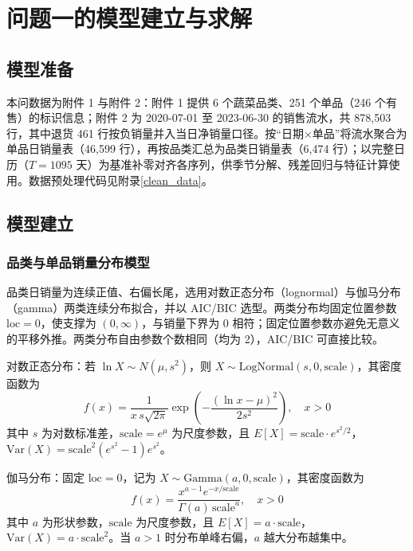 \section{问题一的模型建立与求解}

\subsection{模型准备}

本问数据为附件 1 与附件 2：附件 1 提供 6 个蔬菜品类、251 个单品（246 个有售）的标识信息；附件 2 为 2020-07-01 至 2023-06-30 的销售流水，共 878,503 行，其中退货 461 行按负销量并入当日净销量口径。按“日期$\times$单品”将流水聚合为单品日销量表（46,599 行），再按品类汇总为品类日销量表（6,474 行）；以完整日历（$T=1095$ 天）为基准补零对齐各序列，供季节分解、残差回归与特征计算使用。数据预处理代码见附录\ref{clean_data}。

\subsection{模型建立}

\subsubsection{品类与单品销量分布模型}

品类日销量为连续正值、右偏长尾，选用对数正态分布（lognormal）与伽马分布（gamma）两类连续分布拟合，并以 AIC\cite{akaike1974}/BIC\cite{schwarz1978} 选型。两类分布均固定位置参数 $\mathrm{loc}=0$，使支撑为 $(0,\infty)$，与销量下界为 0 相符；固定位置参数亦避免无意义的平移外推。两类分布自由参数个数相同（均为 2），AIC/BIC 可直接比较。

对数正态分布：若 $\ln X \sim N(\mu, s^2)$，则 $X\sim\mathrm{LogNormal}(s,0,\mathrm{scale})$，其密度函数为
\begin{equation}\label{eq:lognorm}
  f(x)=\frac{1}{x\,s\sqrt{2\pi}}\exp\left(-\frac{(\ln x-\mu)^2}{2s^2}\right),\quad x>0
\end{equation}
其中 $s$ 为对数标准差，$\mathrm{scale}=e^\mu$ 为尺度参数，且 $E[X]=\mathrm{scale}\cdot e^{s^2/2}$，$\mathrm{Var}(X)=\mathrm{scale}^2(e^{s^2}-1)e^{s^2}$。

伽马分布：固定 $\mathrm{loc}=0$，记为 $X\sim\mathrm{Gamma}(a,0,\mathrm{scale})$，其密度函数为
\begin{equation}\label{eq:gamma}
  f(x)=\frac{x^{a-1}e^{-x/\mathrm{scale}}}{\Gamma(a)\,\mathrm{scale}^a},\quad x>0
\end{equation}
其中 $a$ 为形状参数，$\mathrm{scale}$ 为尺度参数，且 $E[X]=a\cdot\mathrm{scale}$，$\mathrm{Var}(X)=a\cdot\mathrm{scale}^2$。当 $a>1$ 时分布单峰右偏，$a$ 越大分布越集中。

